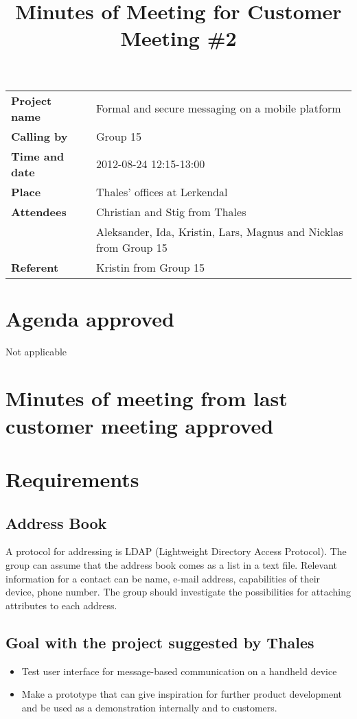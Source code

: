 \documentclass[a4paper,12pt]{article}
\begin{document}
\title{Minutes of Meeting for Customer Meeting \#2}
\maketitle
\begin{tabular}{>{\bfseries}l l}	
Project name&Formal and secure messaging on a mobile platform\\
Calling by&Group 15\\
Time and date&2012-08-24 12:15-13:00\\
Place&Thales' offices at Lerkendal\\
Attendees&Christian and Stig from Thales\\
& Aleksander, Ida, Kristin, Lars, Magnus and Nicklas from Group 15 \\
Referent&Kristin from Group 15\\
\end{tabular}
\section{Agenda approved}
Not applicable
\section{Minutes of meeting from last customer meeting approved}
\section{Requirements}
\subsection{Address Book}
A protocol for addressing is LDAP (Lightweight Directory Access Protocol). The group can assume that the address book comes as a list in a text file. Relevant information for a contact can be name, e-mail address, capabilities of their device, phone number. The group should investigate the possibilities for attaching attributes to each address.
\subsection{Goal with the project suggested by Thales}
\begin{itemize}
\item
Test user interface for message-based communication on a handheld device
\item
Make a prototype that can give inspiration for further product development and be used as a demonstration internally and to customers.
\end{itemize}
\end{document}
